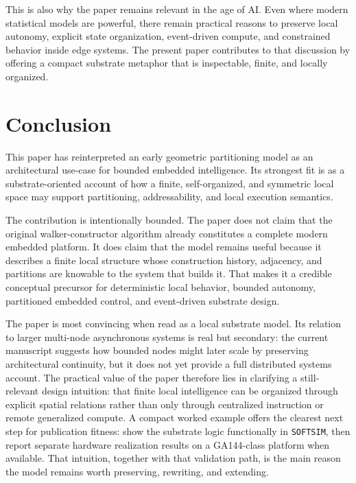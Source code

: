 \documentclass[11pt]{article}
\begin{document}
This is also why the paper remains relevant in the age of AI. Even where modern
statistical models are powerful, there remain practical reasons to preserve
local autonomy, explicit state organization, event-driven compute, and
constrained behavior inside edge systems. The present paper contributes to that
discussion by offering a compact substrate metaphor that is inspectable,
finite, and locally organized.

\section{Conclusion}

This paper has reinterpreted an early geometric partitioning model as an
architectural use-case for bounded embedded intelligence. Its strongest fit is
as a substrate-oriented account of how a finite, self-organized, and symmetric
local space may support partitioning, addressability, and local execution
semantics.

The contribution is intentionally bounded. The paper does not claim that the
original walker-constructor algorithm already constitutes a complete modern
embedded platform. It does claim that the model remains useful because it
describes a finite local structure whose construction history, adjacency, and
partitions are knowable to the system that builds it. That makes it a credible
conceptual precursor for deterministic local behavior, bounded autonomy,
partitioned embedded control, and event-driven substrate design.

The paper is most convincing when read as a local substrate model. Its relation
to larger multi-node asynchronous systems is real but secondary: the current
manuscript suggests how bounded nodes might later scale by preserving
architectural continuity, but it does not yet provide a full distributed
systems account. The practical value of the paper therefore lies in clarifying
a still-relevant design intuition: that finite local intelligence can be
organized through explicit spatial relations rather than only through
centralized instruction or remote generalized compute. A compact worked example
offers the clearest next step for publication fitness: show the substrate logic
functionally in \texttt{SOFTSIM}, then report separate hardware realization
results on a GA144-class platform when available. That intuition, together with
that validation path, is the main reason the model remains worth preserving,
rewriting, and extending.
\end{document}
